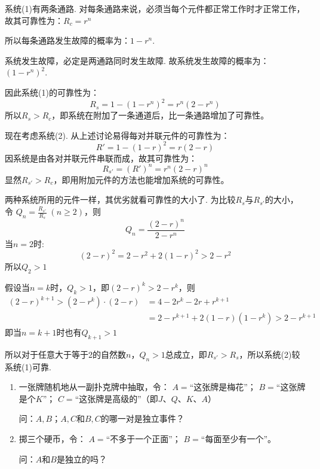 \begin{solution}
    系统(1)有两条通路. 对每条通路来说，必须当每个元件都正常工作时才正常工作，故其可靠性为：$R_c=r^n$

    所以每条通路发生故障的概率为：$1-r^n$.

    系统发生故障，必定是两通路同时发生故障. 故系统发生故障的概率为：$(1-r^n)^2$.

    因此系统(1)的可靠性为：$$R_s=1-(1-r^n)^2=r^n(2-r^n)$$
    所以$R_s>R_c$，即系统在附加了一条通道后，比一条通路增加了可靠性。

    现在考虑系统(2). 从上述讨论易得每对并联元件的可靠性为：$$R'=1-(1-r)^2=r(2-r)$$
    因系统是由各对并联元件串联而成，故其可靠性为：
\[    R_{s'}=(R')^n=r^n(2-r)^n\]
    显然$R_{s'}>R_c$，即用附加元件的方法也能增加系统的可靠性。

两种系统所用的元件一样，其优劣就看可靠性的大小了. 为比较$R_s$与$R_{s'}$的大小，令
$Q_n=\frac{R_{s'}}{R_s}\; (n\ge 2)$，则
\[Q_n=\frac{(2-r)^n}{2-r^n}\]
当$n=2$时:
\[(2-r)^2=2-r^2+2(1-r)^2>2-r^2\]
所以$Q_2>1$

假设当$n=k$时，$Q_k>1$，即$(2-r)^k>2-r^k$，则
\[\begin{split}
 (2-r)^{k+1}>(2-r^k)\cdot (2-r)&=4-2r^k-2r+r^{k+1}\\
&=2-r^{k+1}+2(1-r)(1-r^k)>2-r^{k+1}
\end{split}\]
即当$n=k+1$时也有$Q_{k+1}>1$

所以对于任意大于等于2的自然数$n$，$Q_n>1$总成立，即$R_{s'}>R_s$，所以系统(2)较系统(1)可靠.
\end{solution}

\begin{ex}
\begin{enumerate}
    \item 一张牌随机地从一副扑克牌中抽取，令：    $A=$“这张牌是梅花”；    $B=$“这张牌是个$K$”；    $C=$“这张牌是高级的”（即$J$、$Q$、$K$、$A$）
    
    问：$A,B$；$A,C$和$B,C$的哪一对是独立事件？
    
    \item 掷三个硬币，令：    $A=$“不多于一个正面”；    $B=$“每面至少有一个”。
    
    问：$A$和$B$是独立的吗？
\end{enumerate}
\end{ex}

